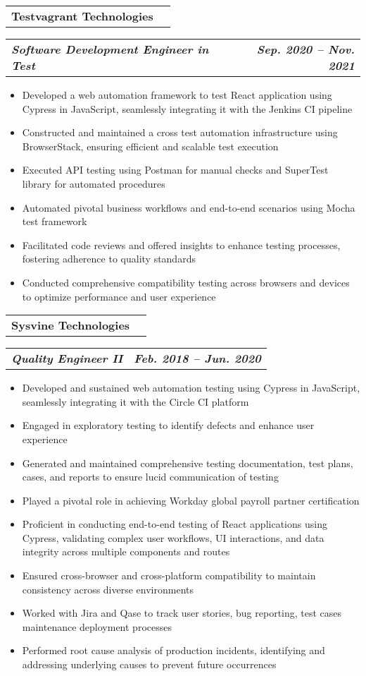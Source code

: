 \documentclass[letterpaper,11pt]{article}
\makeatletter
\newcommand{\resumeItem}[1]{
  \item\small{
    {#1 \vspace{-1pt}}
  }
}
\newcommand{\resumeSubheading}[4]{
  \vspace{-1pt}\item
    \begin{tabular*}{\textwidth}[t]{l@{\extracolsep{\fill}}r}
      \textbf{#1} & {\color{dark-grey}\small #2}\vspace{1pt}\\ %
    \end{tabular*}\vspace{-4pt}
}
\newcommand{\resumeSubSubheading}[2]{
    \item
    \begin{tabular*}{\textwidth}{l@{\extracolsep{\fill}}r}
      \textbf{\textit{\small #1}} & \textbf{\textit{\small #2}} \\
    \end{tabular*}\vspace{-7pt}
}
\newcommand{\resumeItemListStart}{\begin{itemize}}
\newcommand{\resumeItemListEnd}{\end{itemize}\vspace{0pt}}
\makeatother
\begin{document}
    \resumeSubheading
      {Testvagrant Technologies}{}
      {}{}
      \resumeSubSubheading
      {Software Development Engineer in Test}{Sep. 2020 -- Nov. 2021}
      \resumeItemListStart
        \resumeItem{Developed a web automation framework to test React application using Cypress in JavaScript, seamlessly integrating it with the Jenkins CI pipeline}
        \resumeItem{Constructed and maintained a cross test automation infrastructure using BrowserStack, ensuring efficient and scalable test execution}
        \resumeItem{Executed API testing using Postman for manual checks and SuperTest library for automated procedures}
        \resumeItem{Automated pivotal business workflows and end-to-end scenarios using Mocha test framework}
        \resumeItem{Facilitated code reviews and offered insights to enhance testing processes, fostering adherence to quality standards}
        \resumeItem{Conducted comprehensive compatibility testing across browsers and devices to optimize performance and user experience}
    \resumeItemListEnd

    \resumeSubheading
      {Sysvine Technologies}{}
      {}{}
      \resumeSubSubheading
      {Quality Engineer II}{Feb. 2018 -- Jun. 2020}
      \resumeItemListStart
        \resumeItem{Developed and sustained web automation testing using Cypress in JavaScript, seamlessly integrating it with the Circle CI platform}
        \resumeItem{Engaged in exploratory testing to identify defects and enhance user experience}
        \resumeItem{Generated and maintained comprehensive testing documentation, test plans, cases, and reports to ensure lucid communication of testing}
        \resumeItem{Played a pivotal role in achieving Workday global payroll partner certification}
        \resumeItem{Proficient in conducting end-to-end testing of React applications using Cypress, validating complex user workflows, UI interactions, and data integrity across multiple components and routes}
        \resumeItem{Ensured cross-browser and cross-platform compatibility to maintain consistency across diverse environments}
        \resumeItem{Worked with Jira and Qase to track user stories, bug reporting, test cases maintenance deployment processes}
        \resumeItem{Performed root cause analysis of production incidents, identifying and addressing underlying causes to prevent future occurrences}
      \resumeItemListEnd
\end{document}
